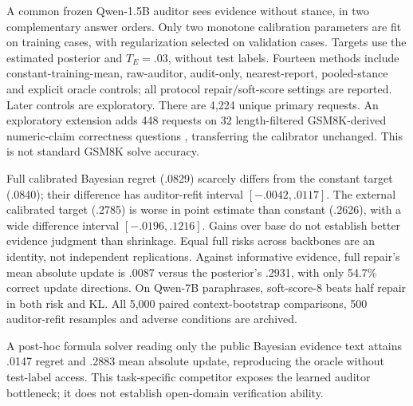 \documentclass{article}
\newcommand{\citep}{\cite}
\begin{document}
A common frozen Qwen-1.5B auditor sees evidence without stance, in two
complementary answer orders. Only two monotone calibration parameters are
fit on training cases, with regularization selected on validation cases.
Targets use the estimated posterior and $T_E=.03$, without test labels.
Fourteen methods include constant-training-mean, raw-auditor, audit-only,
nearest-report, pooled-stance and explicit oracle controls; all protocol
repair/soft-score settings are reported. Later controls are exploratory.
There are 4,224 unique primary requests. An exploratory extension adds 448
requests on 32 length-filtered GSM8K-derived numeric-claim correctness
questions \citep{cobbe2021}, transferring the calibrator unchanged. This
is not standard GSM8K solve accuracy.

\begin{table}[t]
\centering\small
\caption{Fresh study: half repair minus base regret; intervals refit the
auditor and resample training/validation/test cases (500 repetitions).
Two stance prompts are clustered within each of 128 Bayesian contexts or
32 external questions. Half risk and gap changes obey the mixture identity.}
\label{tab:scale}
\resizebox{\textwidth}{!}{}
\end{table}

\begin{table}[t]
\centering\small
\caption{Base-condition report regret for targets shared across backbones.
Raw/calibrated are full repair; constant uses the training mean; nearest
is deterministic; oracle has access to test truth.}
\label{tab:auditor}

\end{table}

Full calibrated Bayesian regret (.0829) scarcely differs from the constant
target (.0840); their difference has auditor-refit interval
$[-.0042,.0117]$. The external calibrated target (.2785) is worse in point
estimate than constant (.2626), with a wide difference interval
$[-.0196,.1216]$. Gains over base do not establish better evidence judgment
than shrinkage. Equal full risks across backbones are an identity, not
independent replications. Against informative evidence, full repair's mean
absolute update is .0087 versus the posterior's .2931, with only 54.7\%
correct update directions. On Qwen-7B paraphrases, soft-score-8 beats half
repair in both risk and KL. All 5,000 paired context-bootstrap comparisons,
500 auditor-refit resamples and adverse conditions are archived.

A post-hoc formula solver reading only the public Bayesian evidence text
attains .0147 regret and .2883 mean absolute update, reproducing the oracle
without test-label access. This task-specific competitor exposes the learned
auditor bottleneck; it does not establish open-domain verification ability.
\end{document}
